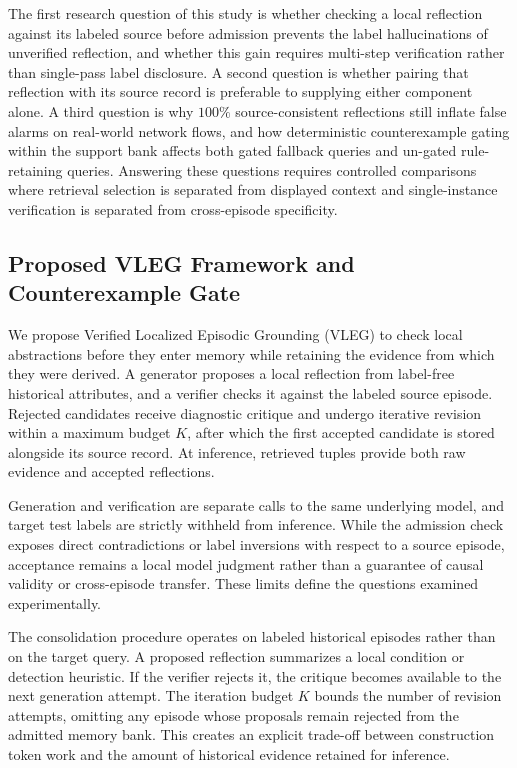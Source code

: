\documentclass[10pt,a4paper,onecolumn]{article}
\theoremstyle{definition}
\theoremstyle{remark}
\begin{document}
The first research question of this study is whether checking a local reflection against its labeled source before admission prevents the label hallucinations of unverified reflection, and whether this gain requires multi-step verification rather than single-pass label disclosure. A second question is whether pairing that reflection with its source record is preferable to supplying either component alone. A third question is why $100\%$ source-consistent reflections still inflate false alarms on real-world network flows, and how deterministic counterexample gating within the support bank affects both gated fallback queries and un-gated rule-retaining queries. Answering these questions requires controlled comparisons where retrieval selection is separated from displayed context and single-instance verification is separated from cross-episode specificity.

\subsection{Proposed VLEG Framework and Counterexample Gate}
We propose Verified Localized Episodic Grounding (VLEG) to check local abstractions before they enter memory while retaining the evidence from which they were derived. A generator proposes a local reflection from label-free historical attributes, and a verifier checks it against the labeled source episode. Rejected candidates receive diagnostic critique and undergo iterative revision within a maximum budget $K$, after which the first accepted candidate is stored alongside its source record. At inference, retrieved tuples provide both raw evidence and accepted reflections.

Generation and verification are separate calls to the same underlying model, and target test labels are strictly withheld from inference. While the admission check exposes direct contradictions or label inversions with respect to a source episode, acceptance remains a local model judgment rather than a guarantee of causal validity or cross-episode transfer. These limits define the questions examined experimentally.

The consolidation procedure operates on labeled historical episodes rather than on the target query. A proposed reflection summarizes a local condition or detection heuristic. If the verifier rejects it, the critique becomes available to the next generation attempt. The iteration budget $K$ bounds the number of revision attempts, omitting any episode whose proposals remain rejected from the admitted memory bank. This creates an explicit trade-off between construction token work and the amount of historical evidence retained for inference.
\end{document}
